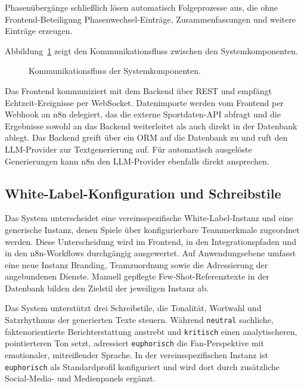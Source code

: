 Phasenübergänge schließlich lösen automatisch Folgeprozesse aus, die ohne Frontend-Beteiligung Phasenwechsel-Einträge, Zusammenfassungen und weitere Einträge erzeugen.

Abbildung~\ref{fig:kommunikationsfluss} zeigt den Kommunikationsfluss zwischen den Systemkomponenten.

\begin{figure}[H]
\centering
\DiagramCommunicationFlow
\caption[Kommunikationsfluss der Systemkomponenten]{Kommunikationsfluss der Systemkomponenten.}
\label{fig:kommunikationsfluss}
\end{figure}

Das Frontend kommuniziert mit dem Backend über REST und empfängt Echtzeit-Ereignisse per WebSocket. Datenimporte werden vom Frontend per Webhook an n8n delegiert, das die externe Sportdaten-API abfragt und die Ergebnisse sowohl an das Backend weiterleitet als auch direkt in der Datenbank ablegt. Das Backend greift über ein ORM auf die Datenbank zu und ruft den LLM-Provider zur Textgenerierung auf. Für automatisch ausgelöste Generierungen kann n8n den LLM-Provider ebenfalls direkt ansprechen.

\subsection{White-Label-Konfiguration und Schreibstile}\label{partner-team-konzept-und-white-label-steuerung}\label{schreibstile}

Das System unterscheidet eine vereinsspezifische White-Label-Instanz und eine generische Instanz, denen Spiele über konfigurierbare Teammerkmale zugeordnet werden. Diese Unterscheidung wird im Frontend, in den Integrationspfaden und in den n8n-Workflows durchgängig ausgewertet. Auf Anwendungsebene umfasst eine neue Instanz Branding, Teamzuordnung sowie die Adressierung der angebundenen Dienste. Manuell gepflegte Few-Shot-Referenztexte in der Datenbank bilden den Zielstil der jeweiligen Instanz ab.

Das System unterstützt drei Schreibstile, die Tonalität, Wortwahl und Satzrhythmus der generierten Texte steuern. Während \texttt{neutral} sachliche, faktenorientierte Berichterstattung anstrebt und \texttt{kritisch} einen analytischeren, pointierteren Ton setzt, adressiert \texttt{euphorisch} die Fan-Perspektive mit emotionaler, mitreißender Sprache. In der vereinsspezifischen Instanz ist \texttt{euphorisch} als Standardprofil konfiguriert und wird dort durch zusätzliche Social-Media- und Medienpanels ergänzt.

